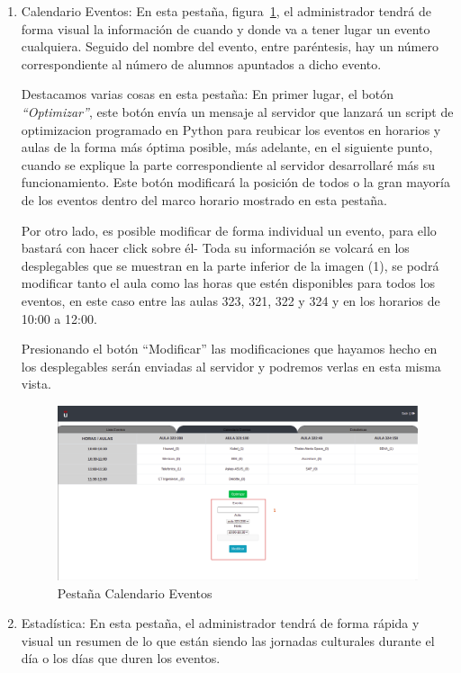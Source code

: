 \documentclass[a4paper, 12pt]{book}
\begin{document}
\begin{enumerate}
	\item Calendario Eventos: En esta pestaña, figura~\ref{fig:adminCalendario}, el administrador tendrá de forma visual la información de cuando y donde va a tener lugar un evento cualquiera. Seguido del nombre del evento, entre paréntesis, hay un número correspondiente al número de alumnos apuntados a dicho evento.
	
	Destacamos varias cosas en esta pestaña: En primer lugar, el botón \textit{``Optimizar''}, este botón envía un mensaje al servidor que lanzará un script de optimizacion programado en Python para reubicar los eventos en horarios y aulas de la forma más óptima posible, más adelante, en el siguiente punto, cuando se explique la parte correspondiente al servidor desarrollaré más su funcionamiento. Este botón modificará la posición de todos o la gran mayoría de los eventos dentro del marco horario mostrado en esta pestaña.
	
	Por otro lado, es posible modificar de forma individual un evento, para ello bastará con hacer click sobre él- Toda su información se volcará en los desplegables que se muestran en la parte inferior de la imagen (1), se podrá modificar tanto el aula como las horas que estén disponibles para todos los eventos, en este caso entre las aulas 323, 321, 322 y 324 y en los horarios de 10:00 a 12:00. 
	
	Presionando el botón ``Modificar'' las modificaciones que hayamos hecho en los desplegables serán enviadas al servidor y podremos verlas en esta misma vista.
	
	\begin{figure}[h!]
  	\centering
  	\includegraphics[width=16cm, keepaspectratio]{img/adminCalendario.png}
  	\caption{Pestaña Calendario Eventos}\label{fig:adminCalendario}
	\end{figure}
	

\item Estadística: En esta pestaña, el administrador tendrá de forma rápida y visual un resumen de lo que están siendo las jornadas culturales durante el día o los días que duren los eventos.


\end{enumerate}
\end{document}
